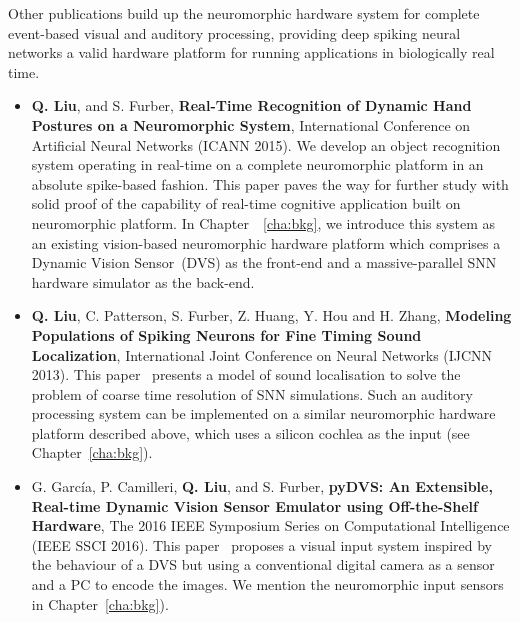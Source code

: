 	Other publications build up the neuromorphic hardware system for complete event-based visual and auditory processing, providing deep spiking neural networks a valid hardware platform for running applications in biologically real time.
\begin{itemize}
	\item 
	\textbf{Q. Liu}, and S. Furber, \textbf{Real-Time Recognition of Dynamic Hand Postures on a Neuromorphic System}, International Conference on Artificial Neural Networks (ICANN 2015).
	We develop an object recognition system operating in real-time on a complete neuromorphic platform in an absolute spike-based fashion.
	This paper paves the way for further study with solid proof of the capability of real-time cognitive application built on neuromorphic platform.
	In Chapter~~\ref{cha:bkg}, we introduce this system as an existing vision-based neuromorphic hardware platform which comprises a Dynamic Vision Sensor~(DVS) as the front-end and a massive-parallel SNN hardware simulator as the back-end. 
	
	\item
	\textbf{Q. Liu}, C. Patterson, S. Furber, Z. Huang, Y. Hou and H. Zhang, \textbf{Modeling Populations of Spiking Neurons for Fine Timing Sound Localization}, International Joint Conference on Neural Networks (IJCNN 2013).
	This paper~\citep{liu2013modeling} presents a model of sound localisation to solve the problem of coarse time resolution of SNN simulations.
	Such an auditory processing system can be implemented on a similar neuromorphic hardware platform described above, which uses a silicon cochlea as the input (see Chapter~\ref{cha:bkg}).
	
	\item 
	G. Garc\'ia, P. Camilleri, \textbf{Q. Liu}, and S. Furber, \textbf{pyDVS: An Extensible, Real-time Dynamic Vision Sensor Emulator using Off-the-Shelf Hardware}, The 2016 IEEE Symposium Series on Computational Intelligence (IEEE SSCI 2016).
	This paper~\citep{7850249} proposes a visual input system inspired by the behaviour of a DVS but using a conventional digital camera as a sensor and a
	PC to encode the images.
	We mention the neuromorphic input sensors in Chapter~\ref{cha:bkg}).
\end{itemize}


